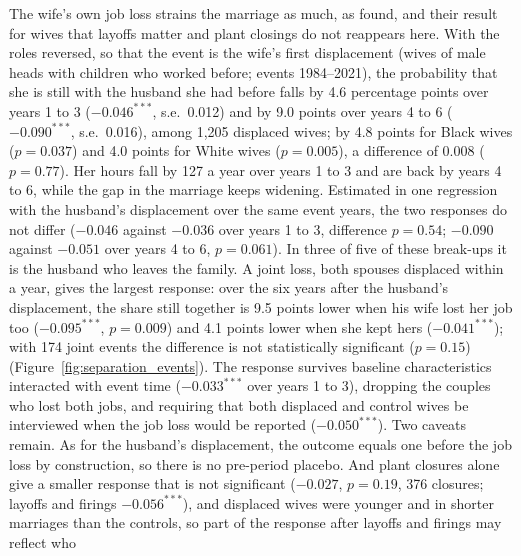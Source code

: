 The wife's own job loss strains the marriage as much, as \citet{charles2004job} found, and their result for wives
that layoffs matter and plant closings do not reappears here. With the roles reversed, so that the event is the wife's first
displacement (wives of male heads with children who worked before; events 1984--2021), the probability that she is
still with the husband she had before falls by 4.6 percentage points over years 1 to 3 ($-0.046^{***}$, s.e.\ 0.012)
and by 9.0 points over years 4 to 6 ($-0.090^{***}$, s.e.\ 0.016), among 1,205 displaced wives; by 4.8 points for Black
wives ($p=0.037$) and 4.0 points for White wives ($p=0.005$), a difference of 0.008 ($p=0.77$). Her hours fall by 127 a
year over years 1 to 3 and are back by years 4 to 6, while the gap in the marriage keeps widening. Estimated in one
regression with the husband's displacement over the same event years, the two responses do not differ ($-0.046$
against $-0.036$ over years 1 to 3, difference $p=0.54$; $-0.090$ against $-0.051$ over years 4 to 6, $p=0.061$). In
three of five of these break-ups it is the husband who leaves the family. A joint loss, both spouses displaced within a
year, gives the largest response: over the six years after the husband's displacement, the share still together is 9.5
points lower when his wife lost her job too ($-0.095^{***}$, $p=0.009$) and 4.1 points lower when she kept hers
($-0.041^{***}$); with 174 joint events the difference is not statistically significant ($p=0.15$)
(Figure~\ref{fig:separation_events}). The response
survives baseline characteristics interacted with event time ($-0.033^{***}$ over years 1 to 3), dropping the couples
who lost both jobs, and requiring that both displaced and control wives be interviewed when the job loss would be
reported ($-0.050^{***}$). Two caveats remain. As for the husband's displacement, the outcome equals one before the
job loss by construction, so there is no pre-period placebo. And plant closures alone give a smaller response that is
not significant ($-0.027$, $p=0.19$, 376 closures; layoffs and firings $-0.056^{***}$), and displaced wives were
younger and in shorter marriages than the controls, so part of the response after layoffs and firings may reflect who
